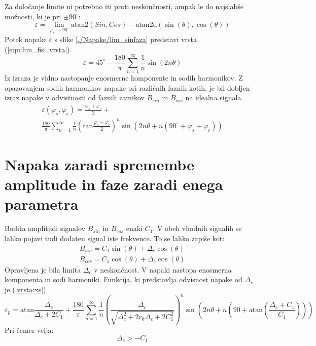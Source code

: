 Za določanje limite ni potrebno iti proti neskončnosti, ampak le do najslabše možnosti, ki je pri $\pm 90^\circ$:
\begin{equation}
\label{equ:fis_lim}
\varepsilon = \lim_{\varphi_{s} \rightarrow 90^\circ} \mathrm{atan2}(Sin ,Cos)- \mathrm{atan2d}(\sin(\theta),\cos(\theta))
\end{equation}
Potek napake $\varepsilon$ s slike \ref{./Napake/lim_sinfaza} predstavi vrsta (\ref{equ:lim_fis_vrsta}).
\begin{equation}
\label{equ:lim_fis_vrsta}
\varepsilon = 45^\circ - \frac{180}{\pi}\sum_{n=1}^{\infty}\frac{1}{n} \sin (2n \theta)
\end{equation} 
Iz  izraza je vidno nastopanje enosmerne komponente in sodih harmonikov. Z opazovanjem sodih harmonikov napake pri različnih faznih kotih, je bil dobljen izraz napake v odvistnosti od faznih zamikov $B_{sin}$ in
$B_{cos}$ na idealna signala.
\begin{multline}
\label{equ:fis_err}
\varepsilon(\varphi_{s},\varphi_{c}) = \frac{\varphi_{s}+\varphi_{c}}{2}+\\ \frac{180}{\pi}\sum_{n=1}^{\infty}\frac{1}{n} (\mathrm{tan}\frac{\varphi_{s}-\varphi_{c}}{2})^n \sin (2n \theta+n(90^\circ +\varphi_{s}+\varphi_{c}))
\end{multline}

\section{Napaka zaradi spremembe amplitude in faze zaradi enega parametra}
\label{izpeljava_atan_napake_staticne}
Bodita amplitudi signalov $B_{sin}$ in $B_{cos}$ enaki $C_1$. V obeh vhodnih signalih se lahko pojavi tudi dodaten signal iste frekvence. To se lahko zapiše kot:
\begin{eqnarray}
\label{xs_analit}
B_{sin} = C_1 \sin(\theta) + \Delta_c \cos(\theta) \\
B_{cos} = C_1 \cos(\theta) + \Delta_c \cos(\theta)
\end{eqnarray}
Opravljena je bila limita $\Delta_c$ v neskončnost. V napaki nastopa enosmerna komponenta in sodi harmoniki. Funkcija, ki predstavlja odvisnost napake od $\Delta_c$ je (\ref{vrsta:xs}).
\begin{equation}
	\label{vrsta:xs}
	\varepsilon_p = \mathrm{atan}\frac{\Delta_c}{\Delta_c+2C_1}+\frac{180}{\pi} \sum_{n=1}^{\infty}\frac{1}{n} (\frac{\Delta_c}{\sqrt{\Delta_c^2+2 r_0\Delta_c+2C_1^2}})^n
	\sin (2n \theta+n (90+ \mathrm{ atan}(\frac{\Delta_c+C_1}{C_1})))
\end{equation}
Pri čemer velja:
$$\Delta_c > -C_1$$

